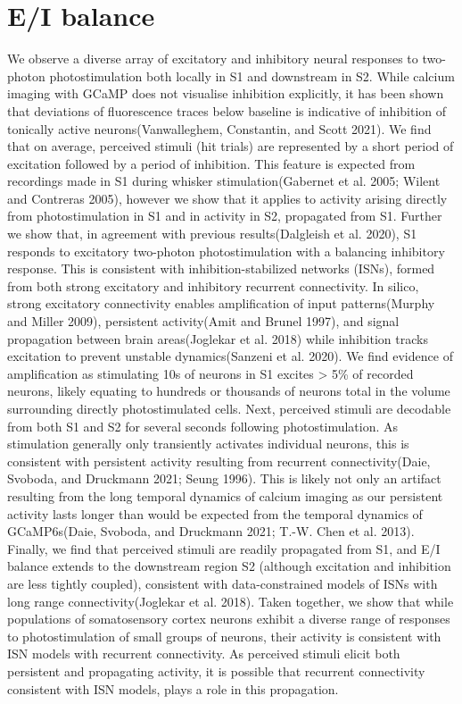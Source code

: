 \section{E/I balance}
We observe a diverse array of excitatory and inhibitory neural responses to two-photon photostimulation both locally in S1 and downstream in S2. While calcium imaging with GCaMP does not visualise inhibition explicitly, it has been shown that deviations of fluorescence traces below baseline is indicative of inhibition of tonically active neurons(Vanwalleghem, Constantin, and Scott 2021). We find that on average, perceived stimuli (hit trials) are represented by a short period of excitation followed by a period of inhibition. This feature is expected from recordings made in S1 during whisker stimulation(Gabernet et al. 2005; Wilent and Contreras 2005), however we show that it applies to activity arising directly from photostimulation in S1 and in activity in S2, propagated from S1.  Further we show that, in agreement with previous results(Dalgleish et al. 2020), S1 responds to excitatory two-photon photostimulation with a balancing inhibitory response. This is consistent with inhibition-stabilized networks (ISNs), formed from both strong excitatory and inhibitory recurrent connectivity. In silico, strong excitatory connectivity enables amplification of input patterns(Murphy and Miller 2009), persistent activity(Amit and Brunel 1997), and signal propagation between brain areas(Joglekar et al. 2018) while inhibition tracks excitation to prevent unstable dynamics(Sanzeni et al. 2020). We find evidence of amplification as stimulating 10s of neurons in S1 excites > 5\% of recorded neurons, likely equating to hundreds or thousands of neurons total in the volume surrounding directly photostimulated cells. Next, perceived stimuli are decodable from both S1 and S2 for several seconds following photostimulation. As stimulation generally only transiently activates individual neurons, this is consistent with persistent activity resulting from recurrent connectivity(Daie, Svoboda, and Druckmann 2021; Seung 1996).  This is likely not only an artifact resulting from the long temporal dynamics of calcium imaging as our persistent activity lasts longer than would be expected from the temporal dynamics of GCaMP6s(Daie, Svoboda, and Druckmann 2021; T.-W. Chen et al. 2013). Finally, we find that perceived stimuli are readily propagated from S1, and E/I balance extends to the downstream region S2 (although excitation and inhibition are less tightly coupled), consistent with data-constrained models of ISNs with long range connectivity(Joglekar et al. 2018). Taken together, we show that while populations of somatosensory cortex neurons exhibit a diverse range of responses to photostimulation of small groups of neurons, their activity is consistent with ISN models with recurrent connectivity. As perceived stimuli elicit both persistent and propagating activity, it is possible that recurrent connectivity consistent with ISN models, plays a role in this propagation.

